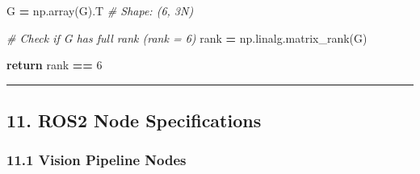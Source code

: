 \documentclass[
]{article}
\newenvironment{Shaded}{\begin{snugshade}}{\end{snugshade}}
\newcommand{\CommentTok}[1]{\textcolor[rgb]{0.56,0.35,0.01}{\textit{#1}}}
\newcommand{\ControlFlowTok}[1]{\textcolor[rgb]{0.13,0.29,0.53}{\textbf{#1}}}
\newcommand{\DecValTok}[1]{\textcolor[rgb]{0.00,0.00,0.81}{#1}}
\newcommand{\NormalTok}[1]{#1}
\newcommand{\OperatorTok}[1]{\textcolor[rgb]{0.81,0.36,0.00}{\textbf{#1}}}
\begin{document}
\begin{Shaded}
\begin{Highlighting}[]
\NormalTok{    G }\OperatorTok{=}\NormalTok{ np.array(G).T  }\CommentTok{\# Shape: (6, 3N)}

    \CommentTok{\# Check if G has full rank (rank = 6)}
\NormalTok{    rank }\OperatorTok{=}\NormalTok{ np.linalg.matrix\_rank(G)}

    \ControlFlowTok{return}\NormalTok{ rank }\OperatorTok{==} \DecValTok{6}
\end{Highlighting}
\end{Shaded}

\begin{center}\rule{0.5\linewidth}{0.5pt}\end{center}

\hypertarget{ros2-node-specifications}{%
\subsection{11. ROS2 Node
Specifications}\label{ros2-node-specifications}}

\hypertarget{vision-pipeline-nodes}{%
\subsubsection{11.1 Vision Pipeline Nodes}\label{vision-pipeline-nodes}}
\end{document}

